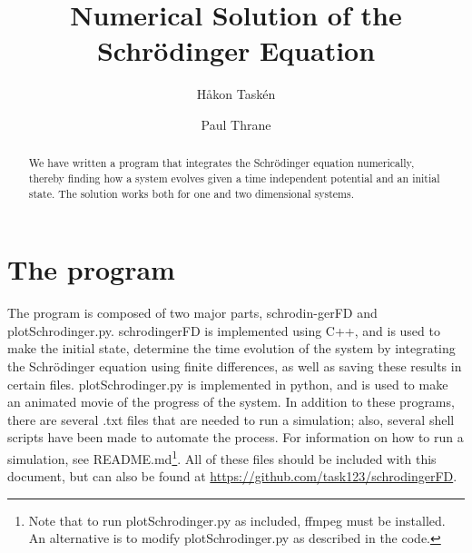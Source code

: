 \documentclass[5p]{elsarticle}       			%
\begin{document}
\begin{frontmatter}


\title{Numerical Solution of the Schr\"{o}dinger Equation}
\author[fysikk]{H\aa kon Task\'{e}n}
\author[fysikk]{Paul Thrane}
\address[fysikk]{Institute for Physics, Norwegian University of Science and Technology, N-7491 Trondheim, Norway.}

\begin{abstract}
We have written a program that integrates the Schr\"{o}dinger equation numerically, thereby finding how a system evolves given a time independent potential and an initial state. The solution works both for one and two dimensional systems.
\end{abstract}

\end{frontmatter}


\section{The program}
The program is composed of two major parts, schrodin-gerFD and plotSchrodinger.py. schrodingerFD is implemented using C++, and is used to make the initial state, determine the time evolution of the system by integrating the Schr\"{o}dinger equation using finite differences, as well as saving these results in certain files. plotSchrodinger.py is implemented in python, and is used to make an animated movie of the progress of the system\cite{jake}. In addition to these programs, there are several .txt files that are needed to run a simulation; also, several shell scripts have been made to automate the process. For information on how to run a simulation, see README.md\footnote{Note that to run plotSchrodinger.py as included, ffmpeg must be installed. An alternative is to modify plotSchrodinger.py as described in the code.}. All of these files should be included with this document, but can also be found at \url{https://github.com/task123/schrodingerFD}.

\end{document}
